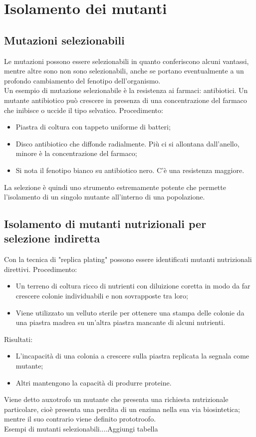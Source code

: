\section{Isolamento dei mutanti}
\subsection{Mutazioni selezionabili}
Le mutazioni possono essere selezionabili in quanto conferiscono alcuni vantassi, mentre altre sono non sono selezionabili, anche se portano eventualmente a un profondo cambiamento del fenotipo dell'organismo. 
\\Un esempio di mutazione selezionabile è la resistenza ai farmaci: antibiotici. Un mutante antibiotico può crescere in presenza di una concentrazione del farmaco che inibisce o uccide il tipo selvatico. Procedimento:
\begin{itemize}
    \item Piastra di coltura con tappeto uniforme di batteri; 
    \item Disco antibiotico che diffonde radialmente. Più ci si allontana dall'anello, minore è la concentrazione del farmaco; 
    \item Si nota il fenotipo bianco su antibiotico nero. C'è una resistenza maggiore.
\end{itemize}
La selezione è quindi uno strumento estremamente potente che permette l'isolamento di un singolo mutante all'interno di una popolazione. 
\subsection{Isolamento di mutanti nutrizionali per selezione indiretta}
Con la tecnica di "replica plating" possono essere identificati mutanti nutrizionali direttivi. Procedimento: 
\begin{itemize}
    \item Un terreno di coltura ricco di nutrienti con diluizione coretta in modo da far crescere colonie individuabili e non sovrapposte tra loro; 
    \item Viene utilizzato un velluto sterile per ottenere una stampa delle colonie da una piastra madrea su un'altra piastra mancante di alcuni nutrienti.
\end{itemize}
Risultati:
\begin{itemize}
    \item L'incapacità di una colonia a crescere sulla piastra replicata la segnala come mutante; 
    \item Altri mantengono la capacità di produrre proteine.
\end{itemize}
Viene detto auxotrofo  un mutante che presenta una richiesta nutrizionale particolare, cioè presenta una perdita di un enzima nella sua via biosintetica; mentre il suo contrario viene definito prototroofo. 
\\Esempi di mutanti selezionabili....Aggiungi tabella
